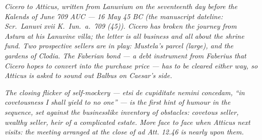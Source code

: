 
\textit{Cicero to Atticus, written from Lanuvium on
the seventeenth day before the Kalends of June 709
AUC --- 16 May 45 BC (the manuscript dateline:
\textit{Scr.\ Lanuvi xvii K.\ Iun.\ a.\ 709 (45)}).
Cicero has broken the journey from Astura at his
Lanuvine villa; the letter is all business and all
about the shrine fund. Two prospective sellers are in
play: Mustela's parcel (large), and the gardens of
Clodia. The Faberian bond --- a debt instrument from
Faberius that Cicero hopes to convert into the
purchase price --- has to be cleared either way, so
Atticus is asked to sound out Balbus on Caesar's
side.}

\textit{The closing flicker of self-mockery ---
\textit{etsi de cupiditate nemini concedam}, ``in
covetousness I shall yield to no one'' --- is the
first hint of humour in the sequence, set against the
businesslike inventory of obstacles: covetous seller,
wealthy seller, heir of a complicated estate. More
face to face when Atticus next visits: the meeting
arranged at the close of \textit{ad Att.} 12.46 is
nearly upon them.}
